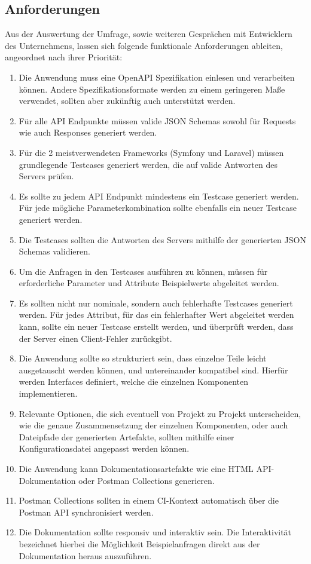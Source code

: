 \subsection{Anforderungen}

Aus der Auswertung der Umfrage, sowie weiteren Gesprächen mit Entwicklern des Unternehmens, lassen sich folgende funktionale Anforderungen ableiten, angeordnet nach ihrer Priorität:

\begin{enumerate}
	\item Die Anwendung muss eine OpenAPI Spezifikation einlesen und verarbeiten können. Andere Spezifikationsformate werden zu einem geringeren Maße verwendet, sollten aber zukünftig auch unterstützt werden.
	\item Für alle API Endpunkte müssen valide JSON Schemas sowohl für Requests wie auch Responses generiert werden.
	\item Für die 2 meistverwendeten Frameworks (Symfony und Laravel) müssen grundlegende Testcases generiert werden, die auf valide Antworten des Servers prüfen. 
	\item Es sollte zu jedem API Endpunkt mindestens ein Testcase generiert werden. Für jede mögliche Parameterkombination sollte ebenfalls ein neuer Testcase generiert werden.
	\item Die Testcases sollten die Antworten des Servers mithilfe der generierten JSON Schemas validieren. 
	\item Um die Anfragen in den Testcases ausführen zu können, müssen für erforderliche Parameter und Attribute Beispielwerte abgeleitet werden. 
	\item Es sollten nicht nur nominale, sondern auch fehlerhafte Testcases generiert werden. Für jedes Attribut, für das ein fehlerhafter Wert abgeleitet werden kann, sollte ein neuer Testcase erstellt werden, und überprüft werden, dass der Server einen Client-Fehler zurückgibt.
	\item Die Anwendung sollte so strukturiert sein, dass einzelne Teile leicht ausgetauscht werden können, und untereinander kompatibel sind. Hierfür werden Interfaces definiert, welche die einzelnen Komponenten implementieren.
	\item Relevante Optionen, die sich eventuell von Projekt zu Projekt unterscheiden, wie die genaue Zusammensetzung der einzelnen Komponenten, oder auch Dateipfade der generierten Artefakte, sollten mithilfe einer Konfigurationsdatei angepasst werden können.
	\item Die Anwendung kann Dokumentationsartefakte wie eine HTML API-Dokumentation oder Postman Collections generieren.
	\item Postman Collections sollten in einem CI-Kontext automatisch über die Postman API synchronisiert werden.
	\item Die Dokumentation sollte responsiv und interaktiv sein. Die Interaktivität bezeichnet hierbei die Möglichkeit Beispielanfragen direkt aus der Dokumentation heraus auszuführen.
\end{enumerate}

